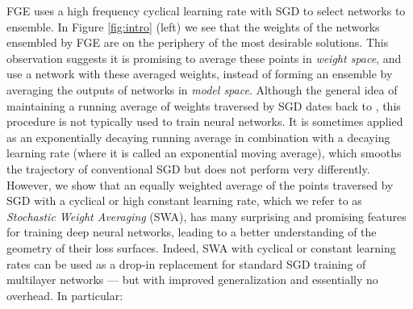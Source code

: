 \documentclass[letterpaper]{article}
\begin{document}
FGE uses a high frequency cyclical learning rate with SGD to select networks to 
ensemble.  In Figure \ref{fig:intro} (left) we see that the weights of the networks 
ensembled by FGE are on the periphery of the most desirable solutions.
This observation suggests it is promising to  
average these points in \emph{weight space}, and use a network with 
these averaged weights, instead of forming an 
ensemble by averaging the outputs of networks in \emph{model space}.
Although the general idea of maintaining a running average of weights traversed by SGD dates back to \citet{ruppert1988}, 
this procedure is not typically used to train neural networks.  It is sometimes applied as an exponentially decaying running average in combination with a decaying learning rate (where it is called an exponential moving average), which smooths the trajectory of
conventional SGD but does not perform very differently. 
However, we show that an equally weighted average of the points traversed by SGD 
with a cyclical or high constant learning rate, which we refer to as \emph{Stochastic Weight Averaging} (SWA), has many surprising and
promising features for training deep neural networks, leading to a better understanding of the geometry of their loss surfaces.
Indeed, SWA with cyclical or constant learning rates can be used as a drop-in replacement for 
standard SGD training of multilayer networks --- but with improved generalization and essentially no overhead. In particular:
\end{document}
